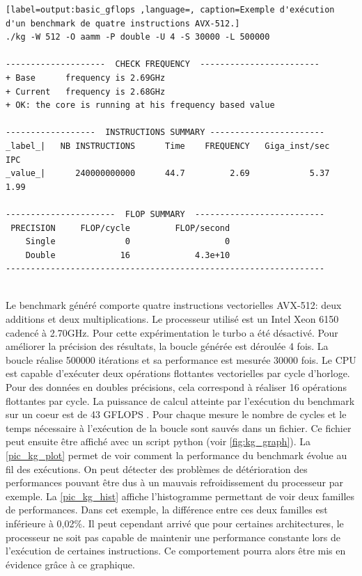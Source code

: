  \begin{minipage}{0.97\linewidth}
 \begin{lstlisting}[label=output:basic_gflops ,language=, caption=Exemple d'exécution d'un benchmark de quatre instructions AVX-512.]
./kg -W 512 -O aamm -P double -U 4 -S 30000 -L 500000

--------------------  CHECK FREQUENCY  ------------------------
+ Base      frequency is 2.69GHz
+ Current   frequency is 2.68GHz
+ OK: the core is running at his frequency based value

------------------  INSTRUCTIONS SUMMARY -----------------------
_label_|   NB INSTRUCTIONS      Time    FREQUENCY   Giga_inst/sec     IPC
_value_|      240000000000      44.7         2.69            5.37    1.99

----------------------  FLOP SUMMARY  --------------------------
 PRECISION     FLOP/cycle         FLOP/second
    Single              0                   0
    Double             16             4.3e+10
----------------------------------------------------------------


\end{lstlisting}   
 \end{minipage}   
        Le benchmark généré comporte quatre instructions vectorielles AVX-512: deux additions et deux multiplications. Le processeur utilisé est un  Intel Xeon 6150 cadencé à 2.70GHz. Pour cette expérimentation le turbo a été désactivé. Pour améliorer la précision des résultats, la boucle générée est déroulée 4 fois. La boucle réalise 500000 itérations et sa performance est mesurée 30000 fois. Le CPU est capable d'exécuter deux opérations flottantes vectorielles par cycle d'horloge. Pour des données en doubles précisions, cela correspond à réaliser 16 opérations flottantes par cycle. La puissance de calcul atteinte par l'exécution du benchmark sur un coeur est de 43 GFLOPS . Pour chaque mesure le nombre de cycles et le temps nécessaire à l'exécution de la boucle sont sauvés dans un fichier. Ce fichier peut ensuite être affiché avec un script python (voir \autoref{fig:kg_graph}). La \autoref{pic_kg_plot} permet de voir comment la performance du benchmark évolue au fil des exécutions. On peut détecter des problèmes de détérioration des performances pouvant être dus à un mauvais refroidissement du processeur par exemple.  La \autoref{pic_kg_hist} affiche l'histogramme permettant de voir deux familles de performances. Dans cet exemple, la différence entre ces deux familles est inférieure à 0,02\%. Il peut cependant arrivé que pour certaines architectures, le processeur ne soit pas capable de maintenir une performance constante lors de l'exécution de certaines instructions. Ce comportement pourra alors être mis en évidence grâce à ce graphique.
        

